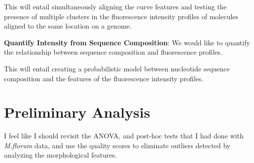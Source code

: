 \begin{tcolorbox}[colback=green!5,colframe=green!40!black,title=Statistical challenge] %
This will entail simultaneously aligning the curve features and testing the presence of multiple clusters in the fluorescence intensity profiles of molecules aligned to the same location on a genome.
\end{tcolorbox}

{\bf{Quantify Intensity from Sequence Composition}}: We would like to quantify the relationship between sequence composition and fluorescence profiles.

\begin{tcolorbox}[colback=green!5,colframe=green!40!black,title=Statistical challenge] %
This will entail creating a probabilistic model between nucleotide sequence composition and the features of the fluorescence intensity profiles.
\end{tcolorbox}

\section{Preliminary Analysis}
\begin{tcolorbox}[colback=red!5,colframe=red!40!black,title=Work in progress] %
I feel like I should revisit the ANOVA, and post-hoc tests that I had done with {\emph{M.florum}} data, and use the quality scores to eliminate outliers detected by analyzing the morphological features.
\end{tcolorbox}


